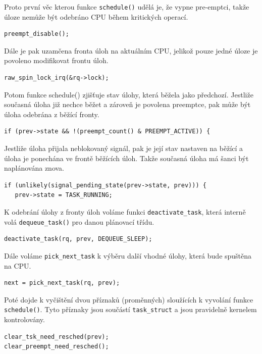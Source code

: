 \documentclass[
  field=ainfk,
  biblatex,
  glossaries,
  index
]{kidiplom}
\begin{document}
Proto první věc kterou funkce \verb#schedule()# udělá je, že vypne pre-emptci, takže úloze nemůže být odebráno CPU během kritických operací. 
\begin{verbatim}
preempt_disable();
\end{verbatim}
Dále je pak uzamčena fronta úloh na aktuálním CPU, jelikož pouze jedné úloze je povoleno modifikovat frontu úloh.
\begin{verbatim}
raw_spin_lock_irq(&rq->lock);
\end{verbatim}
Potom funkce schedule() zjišťuje stav úlohy, která běžela jako předchozí. Jestliže současná úloha již nechce běžet a zároveň je povolena preemptce, pak může být úloha odebrána z běžící fronty. 
\begin{verbatim}
if (prev->state && !(preempt_count() & PREEMPT_ACTIVE)) {
\end{verbatim}
Jestliže úloha přijala neblokovaný signál, pak je její stav nastaven na běžící a úloha je ponechána ve frontě běžících úloh. Takže současná úloha má šanci být naplánována znova. 
\begin{verbatim}
if (unlikely(signal_pending_state(prev->state, prev))) {
   prev->state = TASK_RUNNING;
\end{verbatim}
K odebrání úlohy z fronty úloh voláme funkci \verb#deactivate_task#, která interně volá \verb#dequeue_task()# pro danou plánovací třídu.
\begin{verbatim}
deactivate_task(rq, prev, DEQUEUE_SLEEP);
\end{verbatim}
Dále voláme \verb#pick_next_task# k výběru další vhodné úlohy, která bude spuštěna na CPU. 
\begin{verbatim}
next = pick_next_task(rq, prev);
\end{verbatim}
Poté dojde k vyčištění dvou příznaků (proměnných) sloužících k vyvolání funkce \verb#schedule()#. Tyto příznaky jsou součástí \verb#task_struct# a jsou pravidelně kernelem kontrolovány. 
\begin{verbatim}
clear_tsk_need_resched(prev);
clear_preempt_need_resched();
\end{verbatim}
%
\end{document}
